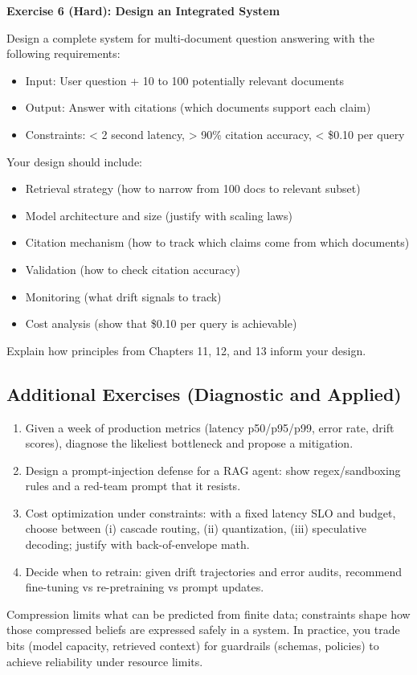 \vspace{0.5em}

\textbf{Exercise 6 (Hard): Design an Integrated System}

Design a complete system for multi-document question answering with the following requirements:

\begin{itemize}
\item Input: User question + 10 to 100 potentially relevant documents
\item Output: Answer with citations (which documents support each claim)
\item Constraints: < 2 second latency, > 90\% citation accuracy, < \$0.10 per query
\end{itemize}

Your design should include:

\begin{itemize}
\item Retrieval strategy (how to narrow from 100 docs to relevant subset)
\item Model architecture and size (justify with scaling laws)
\item Citation mechanism (how to track which claims come from which documents)
\item Validation (how to check citation accuracy)
\item Monitoring (what drift signals to track)
\item Cost analysis (show that \$0.10 per query is achievable)
\end{itemize}

Explain how principles from Chapters 11, 12, and 13 inform your design.

\vspace{2em}
\subsection*{Additional Exercises (Diagnostic and Applied)}
\begin{enumerate}
\item Given a week of production metrics (latency p50/p95/p99, error rate, drift scores), diagnose the likeliest bottleneck and propose a mitigation.
\item Design a prompt-injection defense for a RAG agent: show regex/sandboxing rules and a red-team prompt that it resists.
\item Cost optimization under constraints: with a fixed latency SLO and budget, choose between (i) cascade routing, (ii) quantization, (iii) speculative decoding; justify with back-of-envelope math.
\item Decide when to retrain: given drift trajectories and error audits, recommend fine-tuning vs re-pretraining vs prompt updates.
\end{enumerate}
Compression limits what can be predicted from finite data; constraints shape how those compressed beliefs are expressed safely in a system. In practice, you trade bits (model capacity, retrieved context) for guardrails (schemas, policies) to achieve reliability under resource limits.
